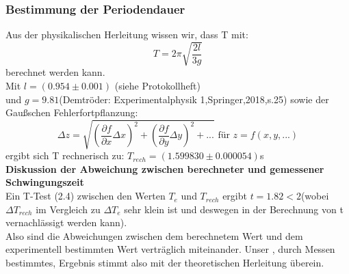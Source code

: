 \documentclass[11pt,a4paper]{article}
\begin{document}
	\subsubsection{Bestimmung der Periodendauer}
	Aus der physikalischen Herleitung wissen wir, dass T mit:
	\begin{equation}
	T=2\pi \sqrt{\frac{2l}{3g}}
	\end{equation}
	berechnet werden kann.\\
	Mit $l=(0.954\pm 0.001)$ (siehe Protokollheft) \\ und $g=9.81$(Demtröder: Experimentalphysik 1,Springer,2018,s.25)
	sowie der Gaußschen Fehlerfortpflanzung:
	\begin{equation}
	\Delta z = \sqrt{(\frac{\partial f}{\partial x}\Delta x)^2 +(\frac {\partial f}{\partial y} \Delta y)^2+...} \text{   für   } z=f(x,y,...)
	\end{equation}
	ergibt sich T rechnerisch zu: $T_{rech}=(1.599830\pm0.000054)$s\\
	{\bf Diskussion der Abweichung zwischen berechneter und gemessener Schwingungszeit}\\
	Ein T-Test (2.4) zwischen den Werten $T_e$ und $T_{rech}$ ergibt $t=1.82<2$(wobei $\Delta T_{rech}$ im Vergleich zu $\Delta T_e$ sehr klein ist und deswegen in der Berechnung von t vernachlässigt werden kann).\\
	Also sind die Abweichungen zwischen dem berechnetem Wert und dem experimentell bestimmten Wert
	verträglich miteinander. Unser , durch Messen bestimmtes, Ergebnis stimmt also mit der theoretischen Herleitung überein.
\end{document}
